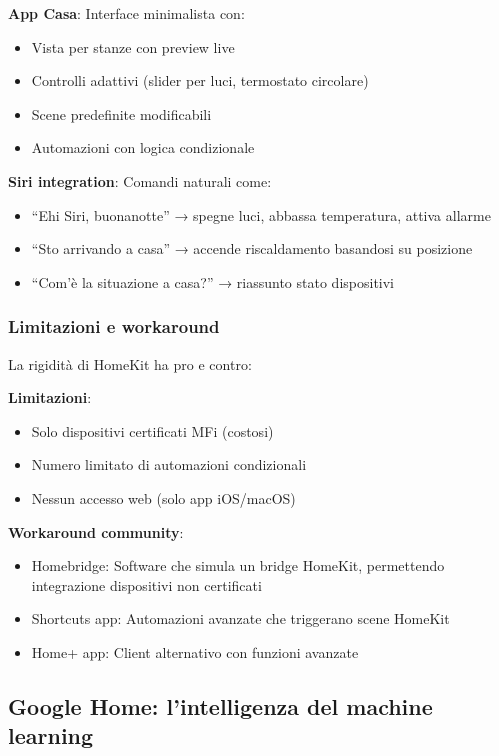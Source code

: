 \textbf{App Casa}: Interface minimalista con:
\begin{itemize}
    \item Vista per stanze con preview live
    \item Controlli adattivi (slider per luci, termostato circolare)
    \item Scene predefinite modificabili
    \item Automazioni con logica condizionale
\end{itemize}

\textbf{Siri integration}: Comandi naturali come:
\begin{itemize}
    \item ``Ehi Siri, buonanotte'' → spegne luci, abbassa temperatura, attiva allarme
    \item ``Sto arrivando a casa'' → accende riscaldamento basandosi su posizione
    \item ``Com'è la situazione a casa?'' → riassunto stato dispositivi
\end{itemize}

\subsubsection{Limitazioni e workaround}

La rigidità di HomeKit ha pro e contro:

\textbf{Limitazioni}:
\begin{itemize}
    \item Solo dispositivi certificati MFi (costosi)
    \item Numero limitato di automazioni condizionali
    \item Nessun accesso web (solo app iOS/macOS)
\end{itemize}

\textbf{Workaround community}:
\begin{itemize}
    \item Homebridge: Software che simula un bridge HomeKit, permettendo integrazione dispositivi non certificati
    \item Shortcuts app: Automazioni avanzate che triggerano scene HomeKit
    \item Home+ app: Client alternativo con funzioni avanzate
\end{itemize}

\cite{Apple2023}

\subsection{Google Home: l'intelligenza del machine learning}

